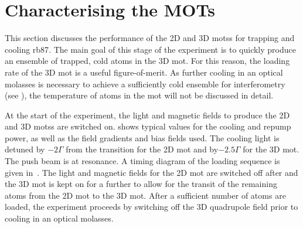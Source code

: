 \section{Characterising the MOTs}\label{sec:mot_characterisation}
This section discusses the performance of the 2D and 3D \acp{mots} for trapping
and cooling \ac{rb87}. The main goal of this stage of the experiment is to
quickly produce an ensemble of trapped, cold atoms in the 3D \ac{mot}. For this
reason, the loading rate of the 3D \ac{mot} is a useful figure-of-merit. As
further cooling in an optical molasses is necessary to achieve a sufficiently
cold ensemble for interferometry (see ), the
temperature of atoms in the \ac{mot} will not be discussed in detail.
\par\noindent
At the start of the experiment, the light and magnetic fields to produce the 2D
and 3D \acp{mots} are switched on.  shows
typical values for the cooling and repump power, as well as the field gradients
and bias fields used. The cooling light is detuned by \(-2 \Gamma\) from the
 transition for the 2D \ac{mot} and by\(-2.5 \Gamma\) for the 3D
\ac{mot}. The push beam is at resonance. A timing diagram of the loading sequence is given in~. The light and magnetic fields
for the 2D \ac{mot} are switched off after  and the
3D \ac{mot} is kept on for a further  to allow for
the transit of the remaining atoms from the 2D \ac{mot} to the 3D \ac{mot}.
After a sufficient number of atoms are loaded, the experiment proceeds by
switching off the 3D quadrupole field prior to cooling in an optical molasses.
